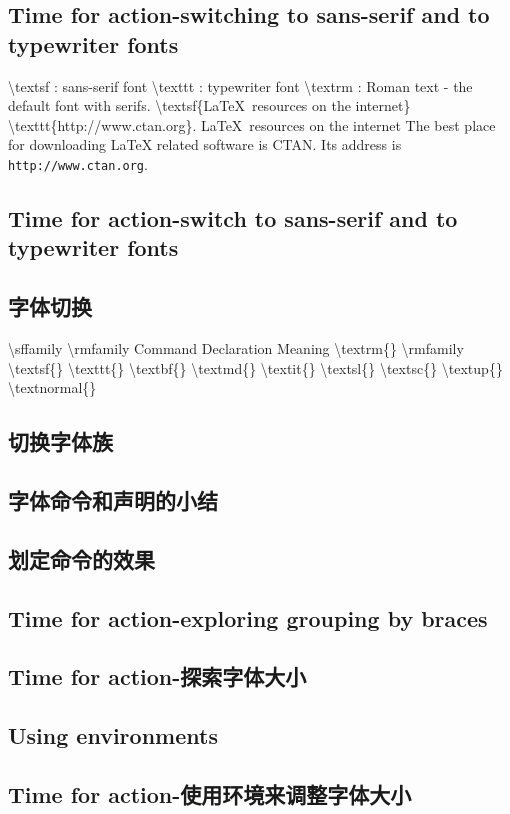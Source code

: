	\subsection{Time for action-switching to sans-serif and to typewriter fonts}
	\textbackslash textsf : sans-serif font
	\textbackslash texttt : typewriter font
	\textbackslash textrm : Roman text - the default font with serifs.
\textbackslash textsf\{LaTeX\ resources on the internet\}
\textbackslash texttt\{http://www.ctan.org\}.
\textsf{LaTeX\ resources on the internet}
The best place for downloading LaTeX related software is CTAN.
Its address is \texttt{http://www.ctan.org}.
	\subsection{Time for action-switch to sans-serif and to typewriter fonts}
	\subsection{字体切换}
	\textbackslash sffamily
	\textbackslash rmfamily
	Command		Declaration		Meaning
	\textbackslash textrm\{\}	\textbackslash rmfamily
	\textbackslash textsf\{\}
	\textbackslash texttt\{\}
	\textbackslash textbf\{\}
	\textbackslash textmd\{\}
	\textbackslash textit\{\}
	\textbackslash textsl\{\}
	\textbackslash textsc\{\}
	\textbackslash textup\{\}
	\textbackslash textnormal\{\}
	\subsection{切换字体族}
	\subsection{字体命令和声明的小结}
	\subsection{划定命令的效果}
	\subsection{Time for action-exploring grouping by braces}
	\subsection{Time for action-探索字体大小}
	\subsection{Using environments}
	\subsection{Time for action-使用环境来调整字体大小}
